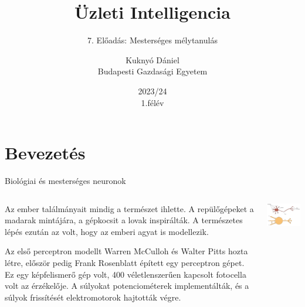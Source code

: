 \documentclass[english, aspectratio=169]{beamer}
\makeatletter
\newcommand\makebeamertitle{\frame{\maketitle}}
\let\origtableofcontents=\tableofcontents
\def\tableofcontents{\@ifnextchar[{\origtableofcontents}{\gobbletableofcontents}}
\def\gobbletableofcontents#1{\origtableofcontents}
\makeatother
\begin{document}
\section{Bevezetés}
\title[]{Üzleti Intelligencia}
\subtitle{7. Előadás: Mesterséges mélytanulás}
\author[Kuknyó Dániel]{Kuknyó Dániel\\Budapesti Gazdasági Egyetem}
\date{2023/24\\1.félév}
\makebeamertitle

\begin{frame}
\tableofcontents{}
\end{frame}

\begin{frame}
\tableofcontents[currentsection]
\end{frame}

\begin{frame}{Biológiai és mesterséges neuronok}
\begin{columns}
\begin{column}{.5\textwidth}
Az ember találmányait mindig a természet ihlette. A repülőgépeket a madarak mintájára, a gépkocsit a lovak inspirálták. A természetes lépés ezután az volt, hogy az emberi agyat is modellezik.\par\medskip
Az első perceptron modellt Warren McCulloh és Walter Pitts hozta létre, először pedig Frank Rosenblatt épített egy perceptron gépet. Ez egy képfelismerő gép volt, 400 véletlenszerűen kapcsolt fotocella volt az érzékelője. A súlyokat potenciométerek implementálták, és a súlyok frissítését elektromotorok hajtották végre. 
\end{column}
\begin{column}{.5\textwidth}
\begin{center}
\includegraphics[width=7cm, keepaspectratio]{images/dl_1.png}
\end{center}
\end{column}
\end{columns}
\end{frame}
\end{document}
